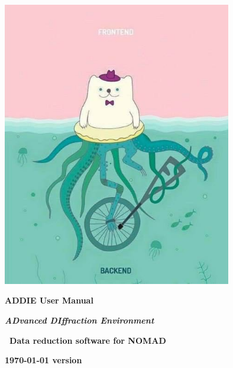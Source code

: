\documentclass{report}
\begin{document}
{\let\cleardoublep
\clearpage 
\begin{titlepage}
	\centering
	\includegraphics[width=0.75\textwidth]{graphics/joke_image.jpg}\par\vspace{1cm}
	\vspace{2cm}
	{\huge\bfseries ADDIE User Manual\par}
	{\LARGE\bfseries\itshape ADvanced DIffraction Environment\par}
	\vspace{1cm}
	{\Large\bfseries\ Data reduction software for NOMAD\par}
	\vfill
	{\large\bfseries \today{} version \par}
\end{titlepage}
 

 \tableofcontents

}

 


\end{document}
